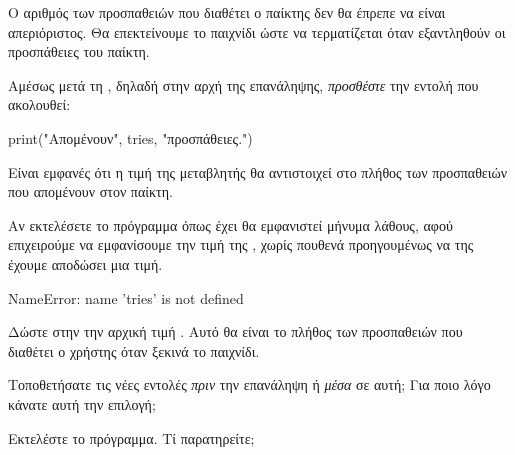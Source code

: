 \documentclass[a4paper,11pt,oneside]{book}
\begin{document}
Ο αριθμός των προσπαθειών που διαθέτει ο παίκτης δεν θα έπρεπε να είναι απεριόριστος. Θα επεκτείνουμε το παιχνίδι ώστε να τερματίζεται όταν εξαντληθούν οι προσπάθειες του παίκτη.

\begin{step}
\label{step:tries-print}
Αμέσως μετά τη , δηλαδή στην αρχή της επανάληψης, \emph{προσθέστε} την εντολή που ακολουθεί:

\begin{pynew}
print("Απομένουν", tries, "προσπάθειες.")
\end{pynew}

Είναι εμφανές ότι η τιμή της μεταβλητής  θα αντιστοιχεί στο πλήθος των προσπαθειών που απομένουν στον παίκτη. 

\marginnote[16pt]{\iconcaution}
Αν εκτελέσετε το πρόγραμμα όπως έχει θα εμφανιστεί μήνυμα λάθους, αφού επιχειρούμε να εμφανίσουμε την τιμή της , χωρίς πουθενά προηγουμένως να της έχουμε αποδώσει μια τιμή.

\marginnote[16pt]{\iconcomputer}
\begin{pyterm}
NameError: name 'tries' is not defined
\end{pyterm}
\end{step}

\begin{step}
\label{step:tries-init}
Δώστε στην  την αρχική τιμή . Αυτό θα είναι το πλήθος των προσπαθειών που διαθέτει ο χρήστης όταν ξεκινά το παιχνίδι. %


Τοποθετήσατε τις νέες εντολές \emph{πριν} την επανάληψη ή \emph{μέσα} σε αυτή; Για ποιο λόγο κάνατε αυτή την επιλογή;

\marginnote[14pt]{\icondiscuss}
\dottedline

\dottedline


Εκτελέστε το πρόγραμμα. Τί παρατηρείτε;

\marginnote[14pt]{\icondiscuss}
\dottedline
\end{step}
\end{document}
